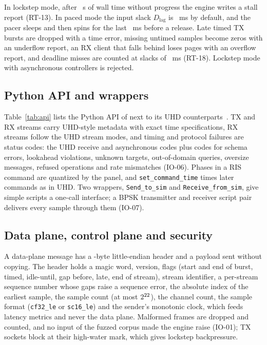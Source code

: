 In lockstep mode, after \numStallTimeoutS~s of wall time without progress
the engine writes a stall report (RT-13). In paced mode the input slack
$D_{\mathrm{lag}}$ is \numPacedLagMs~ms by default, and the pacer sleeps and then spins for
the last \numPacedSpinMs~ms before a release. Late timed TX bursts are dropped with a time
error, missing untimed samples become zeros with an underflow report, an RX client that falls
behind loses pages with an overflow report, and deadline misses are counted at slacks of
\numPacedSlacksMs~ms (RT-18). Lockstep mode with asynchronous controllers is rejected.

\subsection{Python API and wrappers}

Table~\ref{tab:api} lists the Python API of \sremu{} next to its UHD
counterparts~\cite{UHDManual}. TX and RX streams carry UHD-style metadata with exact time
specifications, RX streams follow the UHD stream modes, and timing and protocol failures are status codes: the
UHD receive and asynchronous codes plus codes for schema errors, lookahead violations, unknown
targets, out-of-domain queries, oversize messages, refused operations and rate mismatches
(IO-06). Phases in a RIS command are quantized by the panel, and \texttt{set\_command\_time}
times later commands as in UHD. Two wrappers,
\texttt{Send\_to\_sim} and \texttt{Receive\_from\_sim}, give simple scripts a one-call
interface; a BPSK transmitter and receiver script pair delivers every sample through them
(IO-07).

\subsection{Data plane, control plane and security}
A data-plane message has a \numFrameHeaderBytes-byte little-endian header and
a payload sent without copying. The header holds a magic word, version, flags (start and end
of burst, timed, idle-until, gap before, late, end of stream), stream identifier, a
per-stream sequence number whose gaps raise a sequence error, the absolute index of the
earliest sample, the sample count (at most $2^{22}$), the channel count,
the sample format (\texttt{cf32\_le} or \texttt{sc16\_le}) and the sender's monotonic clock,
which feeds latency metrics and never the data plane. Malformed frames are dropped and
counted, and no input of the fuzzed corpus made the engine raise (IO-01); TX sockets block at their
high-water mark, which gives lockstep backpressure.

